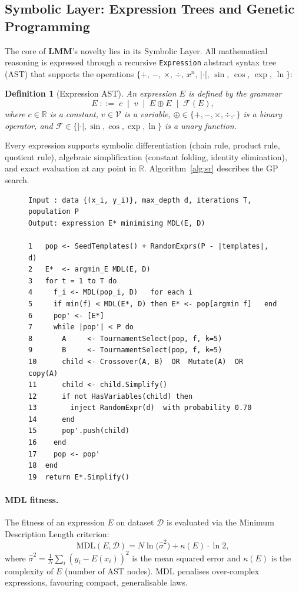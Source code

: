 \documentclass[11pt,a4paper]{article}
\newtheorem{definition}{Definition}[section]
\newcommand{\lmm}{\texorpdfstring{%
  \textbf{\color{lmmAccent}LMM}}{LMM}}
\begin{document}
\subsection{Symbolic Layer: Expression Trees and Genetic Programming}
\label{sec:symbolic}

The core of \lmm{}'s novelty lies in its Symbolic Layer. All mathematical reasoning is expressed through a recursive \texttt{Expression} abstract syntax tree (AST) that supports the operations $\{+,\,-,\,\times,\,\div,\,x^n,\,|\cdot|,\,\sin,\,\cos,\,\exp,\,\ln\}$:

\begin{definition}[Expression AST]
An \emph{expression} $E$ is defined by the grammar
\[
  E \;::=\; c \;\mid\; v \;\mid\; E \oplus E \;\mid\; \mathcal{F}(E),
\]
where $c \in \mathbb{R}$ is a constant, $v \in \mathcal{V}$ is a variable, $\oplus \in \{+,-,\times,\div,\hat{\ }\}$ is a binary operator, and $\mathcal{F} \in \{|\cdot|, \sin, \cos, \exp, \ln\}$ is a unary function.
\end{definition}

Every expression supports symbolic differentiation (chain rule, product rule, quotient rule), algebraic simplification (constant folding, identity elimination), and exact evaluation at any point in $\mathbb{R}$. Algorithm~\ref{alg:sr} describes the GP search.

\begin{figure}[H]
\begin{lstlisting}[style=pseudo, caption={GP Symbolic Regression (\texttt{SymbolicRegression::fit})}, label={alg:sr}]
Input : data {(x_i, y_i)}, max_depth d, iterations T, population P
Output: expression E* minimising MDL(E, D)

1   pop <- SeedTemplates() + RandomExprs(P - |templates|, d)
2   E*  <- argmin_E MDL(E, D)
3   for t = 1 to T do
4     f_i <- MDL(pop_i, D)   for each i
5     if min(f) < MDL(E*, D) then E* <- pop[argmin f]   end
6     pop' <- [E*]
7     while |pop'| < P do
8       A     <- TournamentSelect(pop, f, k=5)
9       B     <- TournamentSelect(pop, f, k=5)
10      child <- Crossover(A, B)  OR  Mutate(A)  OR  copy(A)
11      child <- child.Simplify()
12      if not HasVariables(child) then
13        inject RandomExpr(d)  with probability 0.70
14      end
15      pop'.push(child)
16    end
17    pop <- pop'
18  end
19  return E*.Simplify()
\end{lstlisting}
\end{figure}

\paragraph{MDL fitness.}
The fitness of an expression $E$ on dataset $\mathcal{D}$ is evaluated via the Minimum Description Length criterion:
\begin{equation}
  \text{MDL}(E, \mathcal{D}) = N \ln\!\bigl(\widehat{\sigma}^2\bigr)
  + \kappa(E) \cdot \ln 2,
  \label{eq:mdl}
\end{equation}
where $\widehat{\sigma}^2 = \frac{1}{N}\sum_i (y_i - E(x_i))^2$ is the mean squared error and $\kappa(E)$ is the complexity of $E$ (number of AST nodes). MDL penalises over-complex expressions, favouring compact, generalisable laws.
\end{document}
